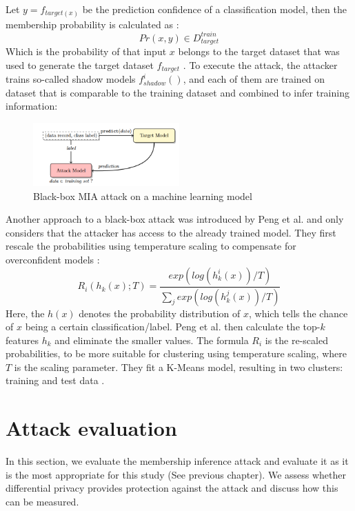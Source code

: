 Let $y = f_{target(x)}$ be the prediction confidence of a classification model, then the membership probability is calculated as \citep{shokri_membership_2017}:
\begin{equation}
  Pr(x, y) \in D^{train}_{target}
\end{equation}
Which is the probability of that input $x$ belongs to the target dataset that was used to generate the target dataset $f_{target}$ \citep{shokri_membership_2017}.
To execute the attack, the attacker trains so-called shadow models $f^i_{shadow}()$, and each of them are trained on dataset that is comparable to the training dataset and combined to infer training information:
\begin{figure}[H]
  \includegraphics[width=0.5\textwidth]{TheorethicalFramework/AttacksOnPrivacy/shadow-models-mi.png}
  \caption{Black-box MIA attack on a machine learning model \citep{shokri_membership_2017}}
\end{figure}

Another approach to a black-box attack was introduced by Peng et al. and only considers that the attacker has access to the already trained model.
They first rescale the probabilities using temperature scaling to compensate for overconfident models \citep{peng_unsupervised_nodate}:
\begin{equation}
  R_i(h_k(x);T) = \frac{exp(log(h^i_k(x))/T)}{\sum_j{exp(log(h^j_k(x))/T)}}
\end{equation}
Here, the $h(x)$ denotes the probability distribution of $x$, which tells the chance of $x$ being a certain classification/label. Peng et al. then calculate the top-$k$ features $h_k$ and eliminate the smaller values.
The formula $R_i$ is the re-scaled probabilities, to be more suitable for clustering using temperature scaling, where $T$ is the scaling parameter.
They fit a K-Means model, resulting in two clusters: training and test data \citep{peng_unsupervised_nodate}.

\newpage

\section{Attack evaluation} \label{theory:attack-evaluation}
In this section, we evaluate the membership inference attack and evaluate it as it is the most appropriate for this study (See previous chapter).
We assess whether differential privacy provides protection against the attack and discuss how this can be measured.
